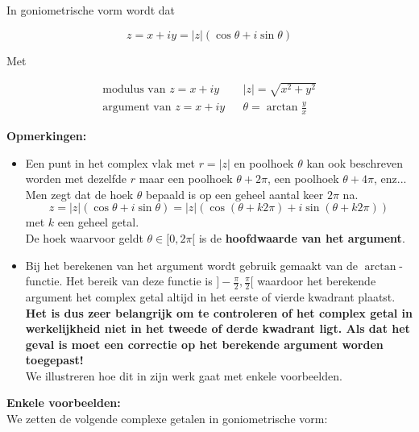 In goniometrische vorm wordt dat

\begin{framed}
\[ z=x+iy=|z|(\cos \theta + i \sin \theta)   \]
\end{framed}

Met 

\begin{framed}
\[ \begin{array}{lll}
\text{modulus van } z=x+iy & & |z|=\sqrt{x^2 +y^2} \\
\text{argument van } z=x+iy & & \theta = \arctan \frac{y}{x}
\end{array} \]
\end{framed}


{\bf Opmerkingen:}\\

\begin{itemize}
	\item Een punt in het complex vlak met $r=|z|$ en poolhoek $\theta$ kan ook beschreven worden met dezelfde $r$ maar een poolhoek $\theta+2\pi$, een poolhoek $\theta+ 4\pi$, enz... Men zegt dat de hoek $\theta$ bepaald is op een geheel aantal keer $2\pi$ na.
	\[ z=|z|(\cos \theta + i \sin \theta)=|z|(\cos(\theta +k2\pi)+i \sin(\theta+k2\pi)) \]
	met $k$ een geheel getal.\\
	De hoek waarvoor geldt $\theta \in [0,2\pi[$ is de {\bf hoofdwaarde van het argument}. 
	\item Bij het berekenen van het argument wordt gebruik gemaakt van de $\arctan$-functie. Het bereik van deze functie is $]-\frac{\pi}{2},\frac{\pi}{2}[$ waardoor het berekende argument het complex getal altijd in het eerste of vierde kwadrant plaatst.\\ 
	{\bf Het is dus zeer belangrijk om te controleren of het complex getal in werkelijkheid niet in het tweede of derde kwadrant ligt. Als dat het geval is moet een correctie op het berekende argument worden toegepast!} \\ We illustreren hoe dit in zijn werk gaat met enkele voorbeelden.
\end{itemize}

{\bf Enkele voorbeelden:} \\

We zetten de volgende complexe getalen in goniometrische vorm: \\

